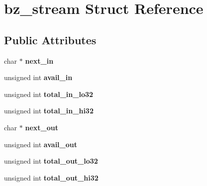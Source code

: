 \hypertarget{structbz__stream}{}\section{bz\+\_\+stream Struct Reference}
\label{structbz__stream}
\subsection*{Public Attributes}
\begin{DoxyCompactItemize}
\item 
char $\ast$ {\bfseries next\+\_\+in}\hypertarget{structbz__stream_aa4a76b5c671cc4092ad7417f2731b894}{}\label{structbz__stream_aa4a76b5c671cc4092ad7417f2731b894}

\item 
unsigned int {\bfseries avail\+\_\+in}\hypertarget{structbz__stream_a3b4296261f93965fc477277c410603af}{}\label{structbz__stream_a3b4296261f93965fc477277c410603af}

\item 
unsigned int {\bfseries total\+\_\+in\+\_\+lo32}\hypertarget{structbz__stream_aacacdc7f753d7eab8652592bd15dbe6e}{}\label{structbz__stream_aacacdc7f753d7eab8652592bd15dbe6e}

\item 
unsigned int {\bfseries total\+\_\+in\+\_\+hi32}\hypertarget{structbz__stream_af5833cfbe5e07a89c9f33783f323c218}{}\label{structbz__stream_af5833cfbe5e07a89c9f33783f323c218}

\item 
char $\ast$ {\bfseries next\+\_\+out}\hypertarget{structbz__stream_ad27d0acafb3b84aada276b157e9aef04}{}\label{structbz__stream_ad27d0acafb3b84aada276b157e9aef04}

\item 
unsigned int {\bfseries avail\+\_\+out}\hypertarget{structbz__stream_a749a8dd37243c6b76f81de5cd2a24e2e}{}\label{structbz__stream_a749a8dd37243c6b76f81de5cd2a24e2e}

\item 
unsigned int {\bfseries total\+\_\+out\+\_\+lo32}\hypertarget{structbz__stream_a7befd6f6ace94f7df3aac07ad48f944b}{}\label{structbz__stream_a7befd6f6ace94f7df3aac07ad48f944b}

\item 
unsigned int {\bfseries total\+\_\+out\+\_\+hi32}\hypertarget{structbz__stream_a8906ddf3e4fcc6963ef6680157647001}{}\label{structbz__stream_a8906ddf3e4fcc6963ef6680157647001}


\end{DoxyCompactItemize}
